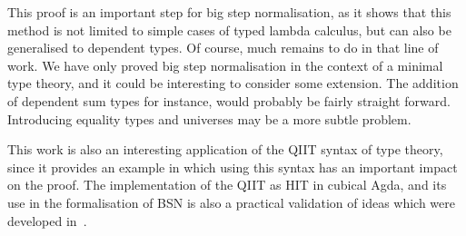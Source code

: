 \documentclass[a4paper,english]{lipics-v2019}
\begin{document}
This proof is an important step for big step normalisation, as it shows that
this method is not limited to simple cases of typed lambda calculus, but can
also be generalised to dependent types. Of course, much remains to do in that
line of work. We have only proved big step normalisation in the context of a
minimal type theory, and it could be interesting to consider some extension.
The addition of dependent sum types for instance, would probably be fairly
straight forward. Introducing equality types and universes may be a more subtle
problem.

This work is also an interesting application of the QIIT syntax of type theory,
since it provides an example in which using this syntax has an important impact
on the proof. The implementation of the QIIT as HIT in cubical Agda, and its use
in the formalisation of BSN is also a practical validation of ideas which were
developed in~\cite{kaposi2016type}.


\end{document}
